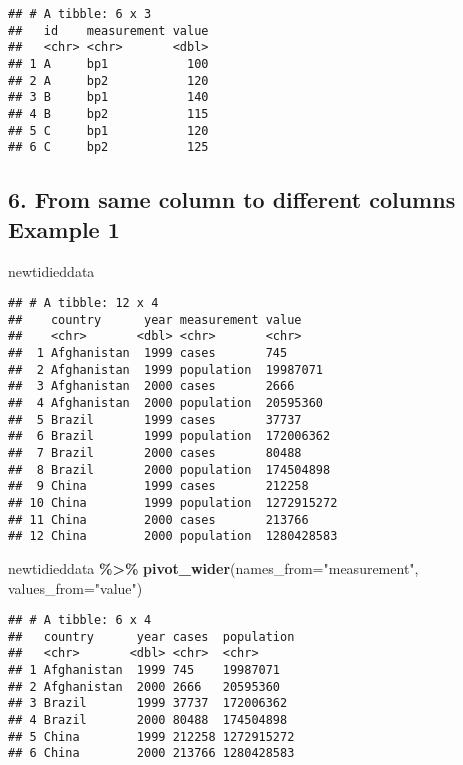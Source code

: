 \documentclass[
]{article}
\newenvironment{Shaded}{\begin{snugshade}}{\end{snugshade}}
\newcommand{\AttributeTok}[1]{\textcolor[rgb]{0.13,0.29,0.53}{#1}}
\newcommand{\FunctionTok}[1]{\textcolor[rgb]{0.13,0.29,0.53}{\textbf{#1}}}
\newcommand{\NormalTok}[1]{#1}
\newcommand{\SpecialCharTok}[1]{\textcolor[rgb]{0.81,0.36,0.00}{\textbf{#1}}}
\newcommand{\StringTok}[1]{\textcolor[rgb]{0.31,0.60,0.02}{#1}}
\begin{document}
\begin{verbatim}
## # A tibble: 6 x 3
##   id    measurement value
##   <chr> <chr>       <dbl>
## 1 A     bp1           100
## 2 A     bp2           120
## 3 B     bp1           140
## 4 B     bp2           115
## 5 C     bp1           120
## 6 C     bp2           125
\end{verbatim}

\hypertarget{from-same-column-to-different-columns-example-1}{%
\subsection{6. From same column to different columns Example
1}\label{from-same-column-to-different-columns-example-1}}

\begin{Shaded}
\begin{Highlighting}[]
\NormalTok{newtidieddata}
\end{Highlighting}
\end{Shaded}

\begin{verbatim}
## # A tibble: 12 x 4
##    country      year measurement value     
##    <chr>       <dbl> <chr>       <chr>     
##  1 Afghanistan  1999 cases       745       
##  2 Afghanistan  1999 population  19987071  
##  3 Afghanistan  2000 cases       2666      
##  4 Afghanistan  2000 population  20595360  
##  5 Brazil       1999 cases       37737     
##  6 Brazil       1999 population  172006362 
##  7 Brazil       2000 cases       80488     
##  8 Brazil       2000 population  174504898 
##  9 China        1999 cases       212258    
## 10 China        1999 population  1272915272
## 11 China        2000 cases       213766    
## 12 China        2000 population  1280428583
\end{verbatim}

\begin{Shaded}
\begin{Highlighting}[]
\NormalTok{newtidieddata }\SpecialCharTok{\%\textgreater{}\%}
\FunctionTok{pivot\_wider}\NormalTok{(}\AttributeTok{names\_from=}\StringTok{"measurement"}\NormalTok{,}
\AttributeTok{values\_from=}\StringTok{"value"}\NormalTok{)}
\end{Highlighting}
\end{Shaded}

\begin{verbatim}
## # A tibble: 6 x 4
##   country      year cases  population
##   <chr>       <dbl> <chr>  <chr>     
## 1 Afghanistan  1999 745    19987071  
## 2 Afghanistan  2000 2666   20595360  
## 3 Brazil       1999 37737  172006362 
## 4 Brazil       2000 80488  174504898 
## 5 China        1999 212258 1272915272
## 6 China        2000 213766 1280428583
\end{verbatim}
\end{document}
